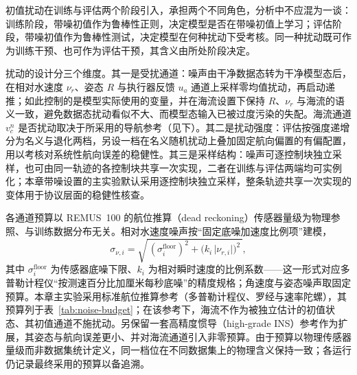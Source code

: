 初值扰动在训练与评估两个阶段引入，承担两个不同角色，分析中不应混为一谈：训练阶段，带噪初值作为鲁棒性正则，决定模型是否在带噪初值上学习；评估阶段，带噪初值作为鲁棒性测试，决定模型在何种扰动下受考核。同一种扰动既可作为训练干预、也可作为评估干预，其含义由所处阶段决定。

扰动的设计分三个维度。其一是受扰通道：噪声由干净数据态转为干净模型态后，在相对水速度 \(\nu_r\)、姿态 \(R\) 与执行器反馈 \(u_a\) 通道上采样零均值扰动，再启动递推；如此控制的是模型实际使用的变量，并在海流设置下保持 \(R\)、\(\nu_r\) 与海流的语义一致，避免数据态扰动看似不大、而模型态输入已被过度污染的失配。海流通道 \(v_c^n\) 是否扰动取决于所采用的导航参考（见下）。其二是扰动强度：评估按强度递增分为名义与退化两档，另设一档在名义随机扰动上叠加固定航向偏置的有偏配置，用以考核对系统性航向误差的稳健性。其三是采样结构：噪声可逐控制块独立采样，也可由同一轨迹的各控制块共享一次实现，二者在训练与评估两端均可实例化；本章带噪设置的主实验默认采用逐控制块独立采样，整条轨迹共享一次实现的变体用于协议层面的稳健性核查。

各通道预算以 REMUS~100 的航位推算（dead reckoning）传感器量级为物理参照、与训练数据分布无关。相对水速度噪声按“固定底噪加速度比例项”建模，
\begin{equation}
  \sigma_{\nu,i}=\sqrt{\,(\sigma_i^{\mathrm{floor}})^2+\big(k_i\,\lvert\nu_{r,i}\rvert\big)^2\,},
  \label{eq:nu-noise-model}
\end{equation}
其中 \(\sigma_i^{\mathrm{floor}}\) 为传感器底噪下限、\(k_i\) 为相对瞬时速度的比例系数——这一形式对应多普勒计程仪“按测速百分比加厘米每秒底噪”的精度规格；角速度与姿态噪声取固定预算。本章主实验采用标准航位推算参考（多普勒计程仪、罗经与速率陀螺），其预算列于表~\ref{tab:noise-budget}；在该参考下，海流不作为被独立估计的初值状态、其初值通道不施扰动。另保留一套高精度惯导（high-grade INS）参考作为扩展，其姿态与航向误差更小、并对海流通道引入非零预算。由于预算以物理传感器量级而非数据集统计定义，同一档位在不同数据集上的物理含义保持一致；各运行仍记录最终采用的预算以备追溯。

